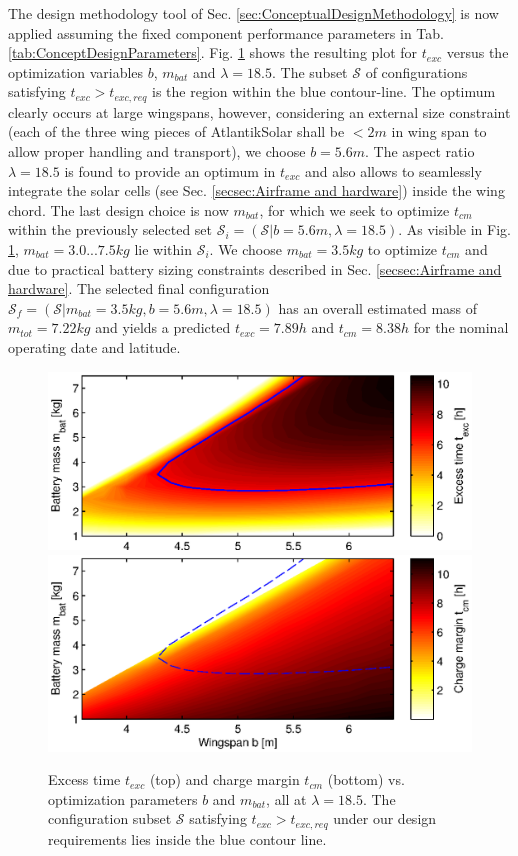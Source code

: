 The design methodology tool of Sec. \ref{sec:ConceptualDesignMethodology} is now applied assuming the fixed component performance parameters in Tab. \ref{tab:ConceptDesignParameters}. Fig. \ref{fig:ExcessTimeChargeMargin} shows the resulting plot for $t_{exc}$ versus the optimization variables $b$, $m_{bat}$ and $\lambda=18.5$. The subset $\mathcal{S}$ of configurations satisfying $t_{exc}>t_{exc,req}$ is the region within the blue contour-line. The optimum clearly occurs at large wingspans, however, considering an external size constraint (each of the three wing pieces of AtlantikSolar shall be $<2m$ in wing span to allow proper handling and transport), we choose $b=5.6m$.  The aspect ratio $\lambda=18.5$ is found to provide an optimum in $t_{exc}$ and also allows to seamlessly integrate the solar cells (see Sec. \ref{secsec:Airframe and hardware}) inside the wing chord. The last design choice is now $m_{bat}$, for which we seek to optimize $t_{cm}$ within the previously selected set $\mathcal{S}_i=(\mathcal{S}|b=5.6m, \lambda=18.5)$. As visible in Fig. \ref{fig:ExcessTimeChargeMargin}, $m_{bat}=3.0...7.5kg$ lie within $\mathcal{S}_i$. We choose $m_{bat}=3.5kg$ to optimize $t_{cm}$ and due to practical battery sizing constraints described in Sec. \ref{secsec:Airframe and hardware}. The selected final configuration $\mathcal{S}_f=(\mathcal{S}|m_{bat}=3.5kg, b=5.6m, \lambda=18.5)$ has an overall estimated mass of $m_{tot}=7.22kg$ and yields a predicted $t_{exc}=7.89h$ and $t_{cm}=8.38h$ for the nominal operating date and latitude.
\begin{figure}[tb]
    \centering
    \includegraphics[width=\linewidth]{images/3_excesstime}
    \includegraphics[width=\linewidth]{images/4_chargemargin}
    \caption{Excess time $t_{exc}$ (top) and charge margin $t_{cm}$ (bottom) vs. optimization parameters $b$ and $m_{bat}$, all at $\lambda=18.5$. The configuration subset $\mathcal{S}$ satisfying $t_{exc}>t_{exc,req}$ under our design requirements lies inside the blue contour line.}
    \label{fig:ExcessTimeChargeMargin}
\end{figure}
